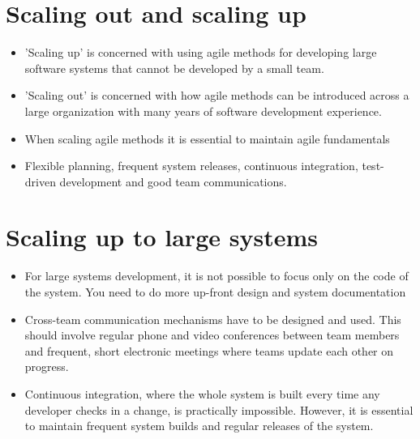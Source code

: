 \section{ Scaling out and scaling up}
\begin{itemize}

\item 'Scaling up' is concerned with using agile methods for developing large software systems that cannot be developed by a small team.

\item 'Scaling out' is concerned with how agile methods can be introduced across a large organization with many years of software development experience.

\item When scaling agile methods it is essential to maintain agile fundamentals

\item Flexible planning, frequent system releases, continuous integration, test-driven development and good team communications.
\end{itemize}
\section{Scaling up to large systems}
\begin{itemize}

\item For large systems development, it is not possible to focus only on the code of the system. You need to do more up-front design and system documentation

\item Cross-team communication mechanisms have to be designed and used. This should involve regular phone and video conferences between team members and frequent, short electronic meetings where teams update each other on progress.

\item Continuous integration, where the whole system is built every time any developer checks in a change, is practically impossible. However, it is essential to maintain frequent system builds and regular releases of the system.

\end{itemize}
